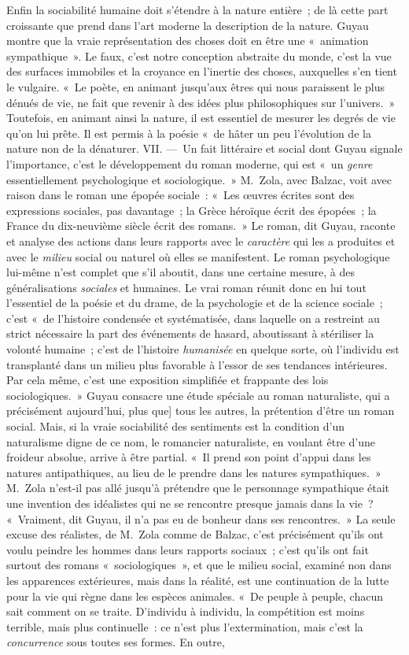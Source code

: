 \documentclass[french,twoside]{book} %
\begin{document}
Enfin la sociabilité humaine doit s’étendre à la nature entière ; de là cette part croissante que prend dans l’art moderne la description de la nature. Guyau montre que la vraie représentation des choses doit en être une « animation sympathique ». Le faux, c’est notre conception abstraite du monde, c’est la vue des surfaces immobiles et la croyance en l’inertie des choses, auxquelles s’en tient le vulgaire. « Le poète, en animant jusqu’aux êtres qui nous paraissent le plus dénués de vie, ne fait que revenir à des idées plus philosophiques sur l’univers. » Toutefois, en animant ainsi la nature, il est essentiel de mesurer les degrés de vie qu’on lui prête. Il est permis à la poésie « de hâter un peu l’évolution de la nature non de la dénaturer. VII. — Un fait littéraire et social dont Guyau signale l’importance, c’est le développement du roman moderne, qui est « un \emph{genre} essentiellement psychologique et sociologique. » M. Zola, avec Balzac, voit avec raison dans le roman une épopée sociale : « Les œuvres écrites sont des expressions sociales, pas davantage ; la Grèce héroïque écrit des épopées ; la France du dix-neuvième siècle écrit des romans. » Le roman, dit Guyau, raconte et analyse des actions dans leurs rapports avec le \emph{caractère} qui les a produites et avec le \emph{milieu} social ou naturel où elles se manifestent. Le roman psychologique lui-même n’est complet que s’il aboutit, dans une certaine mesure, à des généralisations \emph{sociales} et humaines. Le vrai roman réunit donc en lui tout l’essentiel de la poésie et du drame, de la psychologie et de la science sociale ; c’est « de l’histoire condensée et systématisée, dans laquelle on a restreint au strict nécessaire la part des événements de hasard, aboutissant à stériliser la volonté humaine ; c’est de l’histoire \emph{humanisée} en quelque sorte, où l’individu est transplanté dans un milieu plus favorable à l’essor de ses tendances intérieures. Par cela même, c’est une exposition simplifiée et frappante des lois sociologiques. » Guyau consacre une étude spéciale au roman naturaliste, qui a précisément aujourd’hui, plus que] tous les autres, la prétention d’être un roman social. Mais, si la vraie sociabilité des sentiments est la condition d’un naturalisme digne de ce nom, le romancier naturaliste, en voulant être d’une froideur absolue, arrive à être partial. « Il prend son point d’appui dans les natures antipathiques, au lieu de le prendre dans les natures sympathiques. » M. Zola n’est-il pas allé jusqu’à prétendre que le personnage sympathique était une invention des idéalistes qui ne se rencontre presque jamais dans la vie ? « Vraiment, dit Guyau, il n’a pas eu de bonheur dans ses rencontres. » La seule excuse des réalistes, de M. Zola comme de Balzac, c’est précisément qu’ils ont voulu peindre les hommes dans leurs rapports sociaux ; c’est qu’ils ont fait surtout des romans « sociologiques », et que le milieu social, examiné non dans les apparences extérieures, mais dans la réalité, est une continuation de la lutte pour la vie qui règne dans les espèces animales. « De peuple à peuple, chacun sait comment on se traite. D’individu à individu, la compétition est moins terrible, mais plus continuelle : ce n’est plus l’extermination, mais c’est la \emph{concurrence} sous toutes ses formes. En outre, 
\end{document}

